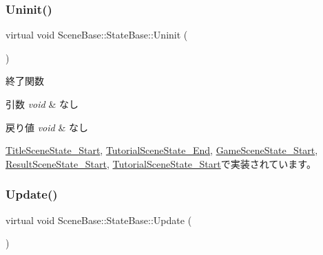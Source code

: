 \subsubsection{\texorpdfstring{Uninit()}{Uninit()}}
{\footnotesize\ttfamily virtual void Scene\+Base\+::\+State\+Base\+::\+Uninit (\begin{DoxyParamCaption}{ }\end{DoxyParamCaption})\hspace{0.3cm}{\ttfamily [pure virtual]}}



終了関数 


\begin{DoxyParams}{引数}
{\em void} & なし \\
\hline
\end{DoxyParams}

\begin{DoxyRetVals}{戻り値}
{\em void} & なし \\
\hline
\end{DoxyRetVals}


\mbox{\hyperlink{class_title_scene_state___start_a5bcb4d7a9250ea1c0041c38616ffabfe}{Title\+Scene\+State\+\_\+\+Start}}, \mbox{\hyperlink{class_tutorial_scene_state___end_aafc0d8d042de8c7f79d84fcdc35a807c}{Tutorial\+Scene\+State\+\_\+\+End}}, \mbox{\hyperlink{class_game_scene_state___start_a636df8b7ac0173b044b0efc2927fb83b}{Game\+Scene\+State\+\_\+\+Start}}, \mbox{\hyperlink{class_result_scene_state___start_af5b9af607074e3296481a1660607fb9a}{Result\+Scene\+State\+\_\+\+Start}}, \mbox{\hyperlink{class_tutorial_scene_state___start_a974962addfb0bcba90fbab64ac6d50f0}{Tutorial\+Scene\+State\+\_\+\+Start}}で実装されています。

\mbox{\label{class_scene_base_1_1_state_base_ad2c6c8fd9f020eb02f64f394edee129c}} 
\subsubsection{\texorpdfstring{Update()}{Update()}}
{\footnotesize\ttfamily virtual void Scene\+Base\+::\+State\+Base\+::\+Update (\begin{DoxyParamCaption}{ }\end{DoxyParamCaption})\hspace{0.3cm}{\ttfamily [pure virtual]}}




